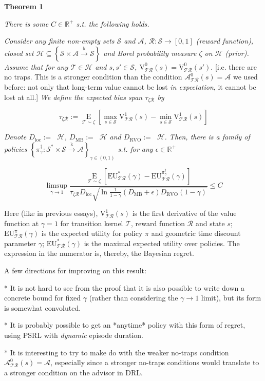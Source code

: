 \documentclass[a4paper]{article}
\newcommand{\Co}[1]{}
\newcommand{\AP}[1]{\left(#1\right)}
\newcommand{\AB}[1]{\left[#1\right]}
\newcommand{\AC}[1]{\left\{#1\right\}}
\newcommand{\Ea}[2]{\underset{#1}{\operatorname{E}}\AB{#2}}
\newcommand{\Reals}{\mathbb{R}}
\newcommand{\K}{\xrightarrow{\mathrm{k}}}
\newcommand{\St}{\mathcal{S}}
\newcommand{\A}{\mathcal{A}}
\newcommand{\R}{\mathcal{R}}
\newcommand{\T}{\mathcal{T}}
\newcommand{\Hy}{\mathcal{H}}
\DeclareMathOperator{\RVO}{\dim_{RVO}}
\DeclareMathOperator{\MB}{\dim_{MB}}
\DeclareMathOperator{\LD}{\dim_{loc}}
\newcommand{\DRVO}{D_{\mathrm{RVO}}}
\newcommand{\DMB}{D_{\mathrm{MB}}}
\newcommand{\DL}{D_{\mathrm{loc}}}
\newcommand{\V}{\mathrm{V}}
\newcommand{\EU}{\mathrm{EU}}
\begin{document}
\textbf{Theorem 1}\Co{b}

\textit{There is some $C\in\Reals^+$ s.t. the following holds.}\Co{i}

\textit{Consider any finite non-empty sets $\St$ and $\A$, $\R:\St\rightarrow[0,1]$ (reward function), closed set $\Hy\subseteq\AC{\St\times\A\K\St}$ and Borel probability measure $\zeta$ on $\Hy$ (prior). Assume that for any $\T\in\Hy$ and $s,s'\in\St$, $\V_{\T\R}^0(s)=\V_{\T\R}^0\AP{s'}.$}\Co{i} [i.e. there are no traps. This is a stronger condition than the condition $\A^0_{\T\R}(s) = \A$ we used before: not only that long-term value cannot be lost \textit{in expectation}\Co{i}, it cannot be lost at all.] \textit{We define the expected bias span $\tau_{\zeta\R}$ by}\Co{i}

$$\tau_{\zeta\R}:=\Ea{\T\sim\zeta}{\max_{s\in\St}\V^1_{\T\R}(s)-\min_{s\in\St}\V^1_{\T\R}(s)}$$

\textit{Denote $\DL:=\LD{\Hy}$, $\DMB:=\MB{\Hy}$ and $\DRVO:=\RVO{\Hy}$. Then, there is a family of policies $\AC{\pi^\dagger_\gamma:\St^*\times\St\K\A}_{\gamma\in(0,1)}$ s.t. for any $\epsilon\in\Reals^+$}\Co{i}

$$\limsup_{\gamma \rightarrow 1}\frac{\Ea{\T\sim\zeta}{\EU^*_{\T\R}(\gamma)-\EU^{\pi^\dagger_\gamma}_{\T\R}(\gamma)}}{\tau_{\zeta\R}\DL\sqrt{\ln{\frac{1}{1-\gamma}}\AP{\DMB+\epsilon}\DRVO(1-\gamma)}}\leq C$$

Here (like in previous essays), $\V^1_{\T\R}(s)$ is the first derivative of the value function at $\gamma=1$ for transition kernel $\T$, reward function $\R$ and state $s$; $\EU^{\pi}_{\T\R}(\gamma)$ is the expected utility for policy $\pi$ and geometric time discount parameter $\gamma$; $\EU^*_{\T\R}(\gamma)$ is the maximal expected utility over policies. The expression in the numerator is, thereby, the Bayesian regret.

A few directions for improving on this result:

* It is not hard to see from the proof that it is also possible to write down a concrete bound for fixed $\gamma$ (rather than considering the $\gamma\rightarrow 1$ limit), but its form is somewhat convoluted.

* It is probably possible to get an *anytime* policy with this form of regret, using PSRL with \textit{dynamic}\Co{i} episode duration.

* It is interesting to try to make do with the weaker no-traps condition $\A^0_{\T\R}(s) = \A$, especially since a stronger no-traps conditions would translate to a stronger condition on the advisor in DRL.
\end{document}
